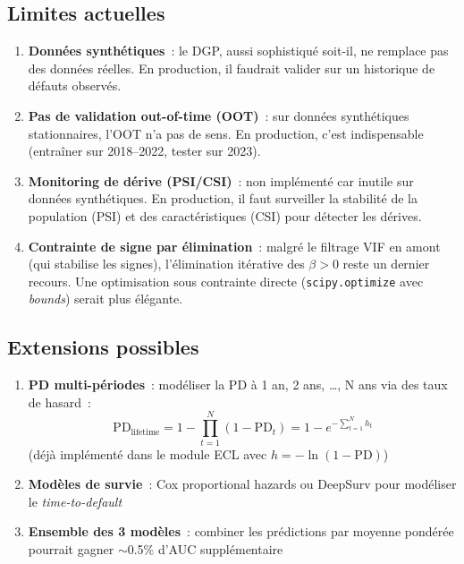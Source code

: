 \documentclass[12pt,a4paper]{article}
\begin{document}
\subsection{Limites actuelles}

\begin{enumerate}
    \item \textbf{Donn\'ees synth\'etiques}~: le DGP, aussi sophistiqu\'e soit-il, ne remplace pas des donn\'ees r\'eelles. En production, il faudrait valider sur un historique de d\'efauts observ\'es.

    \item \textbf{Pas de validation out-of-time (OOT)}~: sur donn\'ees synth\'etiques stationnaires, l'OOT n'a pas de sens. En production, c'est indispensable (entra\^iner sur 2018--2022, tester sur 2023).

    \item \textbf{Monitoring de d\'erive (PSI/CSI)}~: non impl\'ement\'e car inutile sur donn\'ees synth\'etiques. En production, il faut surveiller la stabilit\'e de la population (PSI) et des caract\'eristiques (CSI) pour d\'etecter les d\'erives.

    \item \textbf{Contrainte de signe par \'elimination}~: malgr\'e le filtrage VIF en amont (qui stabilise les signes), l'\'elimination it\'erative des $\beta > 0$ reste un dernier recours. Une optimisation sous contrainte directe (\texttt{scipy.optimize} avec \textit{bounds}) serait plus \'el\'egante.
\end{enumerate}

\subsection{Extensions possibles}

\begin{enumerate}
    \item \textbf{PD multi-p\'eriodes}~: mod\'eliser la PD \`a 1 an, 2 ans, \ldots, N ans via des taux de hasard~:
    $$\text{PD}_{\text{lifetime}} = 1 - \prod_{t=1}^{N} (1 - \text{PD}_t) = 1 - e^{-\sum_{t=1}^N h_t}$$
    (d\'ej\`a impl\'ement\'e dans le module ECL avec $h = -\ln(1 - \text{PD})$)

    \item \textbf{Mod\`eles de survie}~: Cox proportional hazards ou DeepSurv pour mod\'eliser le \textit{time-to-default}

    \item \textbf{Ensemble des 3 mod\`eles}~: combiner les pr\'edictions par moyenne pond\'er\'ee pourrait gagner $\sim$0.5\% d'AUC suppl\'ementaire
\end{enumerate}
\end{document}
